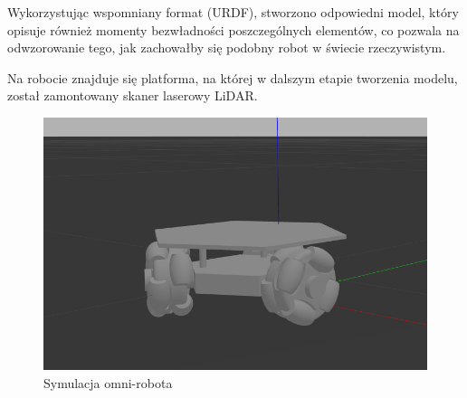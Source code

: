 Wykorzystując wspomniany format (URDF), stworzono odpowiedni model, który
opisuje również momenty bezwładności poszczególnych elementów, co pozwala na
odwzorowanie tego, jak zachowałby się podobny robot w świecie rzeczywistym.

Na robocie znajduje się platforma, na której w dalszym etapie tworzenia modelu,
został zamontowany skaner laserowy LiDAR.

\begin{figure}
  \centering
  \includegraphics[width=140mm]{graphics/robot.png}
  \caption{Symulacja omni-robota}
  \label{fig:forklift}
\end{figure}
\newpage
